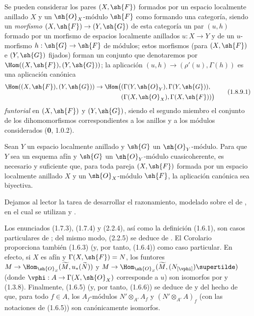 \begin{env}[1.8.9]
\label{ega2:addendum:I.1.8.9-fr}
Se pueden considerar los pares $(X,\sh{F})$ formados por un espacio localmente anillado $X$ y un $\sh{O}_X$-módulo $\sh{F}$ como formando una categoría, siendo un \emph{morfismo} $(X,\sh{F})\to(Y,\sh{G})$ de esta categoría un par $(u,h)$ formado por un morfismo de
espacios localmente anillados $u:X\to Y$ y de un $u$-morfismo
$h:\sh{G}\to\sh{F}$ de módulos; estos
morfismos (para $(X,\sh{F})$ e $(Y,\sh{G})$ fijados) forman un conjunto
que denotaremos por $\Hom((X,\sh{F}),(Y,\sh{G}))$; la aplicación
$(u,h)\to(\rho'(u),\Gamma(h))$ es una aplicación canónica
\begin{equation}
\label{ega2:addendum:I.1.8.9.1-fr}
\begin{split}
  \Hom((X,\sh{F}),(Y,\sh{G}))\to
  \Hom\bigl(
    &(\Gamma(Y,\sh{O}_Y),\Gamma(Y,\sh{G})),\\
    &(\Gamma(X,\sh{O}_X),\Gamma(X,\sh{F}))
  \bigr)
\end{split}
\tag{1.8.9.1}
\end{equation}
\emph{funtorial} en $(X,\sh{F})$ y $(Y,\sh{G})$, siendo el segundo miembro
el conjunto de los dihomomorfismos correspondientes a los anillos y a
los módulos considerados (\textbf 0, 1.0.2).
\end{env}

\begin{corollary}[1.8.10]
\label{ega2:addendum:I.1.8.10-fr}
Sean $Y$ un espacio localmente anillado y $\sh{G}$ un
$\sh{O}_Y$-módulo. Para que $Y$ sea un esquema afín y $\sh{G}$ un
$\sh{O}_Y$-módulo cuasicoherente, es necesario y suficiente que, para
toda pareja $(X,\sh{F})$ formada por un espacio localmente anillado $X$
y un $\sh{O}_X$-módulo $\sh{F}$, la aplicación canónica
 sea biyectiva.
\end{corollary}

Dejamos al lector la tarea de desarrollar el razonamiento, modelado
sobre el de , en el cual se utilizan  y
.

\begin{remark}[1.8.11]
\label{ega2:addendum:I.1.8.11-fr}
Los enunciados (1.7.3), (1.7.4) y (2.2.4), así como la
definición (1.6.1), son casos particulares de ; del
mismo modo, (2.2.5) se deduce de . El
Corolario~ proporciona también (1.6.3) (y, por tanto,
(1.6.4)) como caso particular. En efecto, si $X$ es afín y
$\Gamma(X,\sh{F})=N$, los funtores
$M\to
  \Hom_{\sh{O}_S}(\widetilde M,u_*(\widetilde N))$ y $M\to
  \Hom_{\sh{O}_S}(\widetilde M,(N_{[\vphi]})\supertilde)$
(donde $\vphi:A\to\Gamma(X,\sh{O}_X)$ corresponde a $u$) son
isomorfos por  y (1.3.8). Finalmente, (1.6.5) (y,
por tanto, (1.6.6)) se deduce de  y del hecho de que,
para todo $f\in A$, los $A_f$-módulos
$N'\otimes_{A'}A_f$ y $(N'\otimes_{A'}A)_f$
(con las notaciones de (1.6.5)) son canónicamente isomorfos.
\end{remark}

